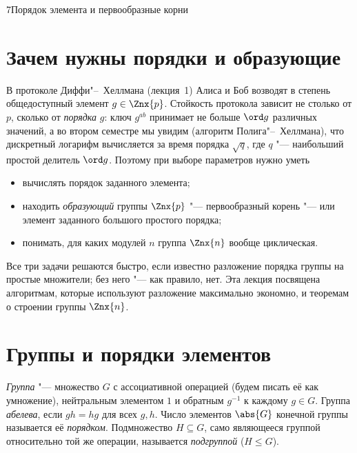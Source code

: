 \begin{lecture}{7}{Порядок элемента и первообразные корни}

\section{Зачем нужны порядки и образующие}

В протоколе Диффи"--~Хеллмана (лекция~1) Алиса и Боб возводят в степень общедоступный элемент
$g \in \Znx{p}$. Стойкость протокола зависит не столько от $p$, сколько от \emph{порядка} $g$:
ключ $g^{ab}$ принимает не больше $\ord g$ различных значений, а во втором семестре мы увидим
(алгоритм Полига"--~Хеллмана), что дискретный логарифм вычисляется за время порядка
$\sqrt{q}$, где $q$ "--- наибольший простой делитель $\ord g$. Поэтому при выборе параметров
нужно уметь
\begin{itemize}
  \item вычислять порядок заданного элемента;
  \item находить \emph{образующий} группы $\Znx{p}$ "--- первообразный корень "--- или элемент
    заданного большого простого порядка;
  \item понимать, для каких модулей $n$ группа $\Znx{n}$ вообще циклическая.
\end{itemize}
Все три задачи решаются быстро, если известно разложение порядка группы на простые множители;
без него "--- как правило, нет. Эта лекция посвящена алгоритмам, которые используют разложение
максимально экономно, и теоремам о строении группы $\Znx{n}$.

\section{Группы и порядки элементов}

\begin{definition}
\emph{Группа} "--- множество $G$ с ассоциативной операцией (будем писать её как умножение),
нейтральным элементом $1$ и обратным $g^{-1}$ к каждому $g \in G$. Группа \emph{абелева}, если
$gh = hg$ для всех $g, h$. Число элементов $\abs{G}$ конечной группы называется её
\emph{порядком}. Подмножество $H \subseteq G$, само являющееся группой относительно той же
операции, называется \emph{подгруппой} ($H \le G$).
\end{definition}


\end{lecture}
